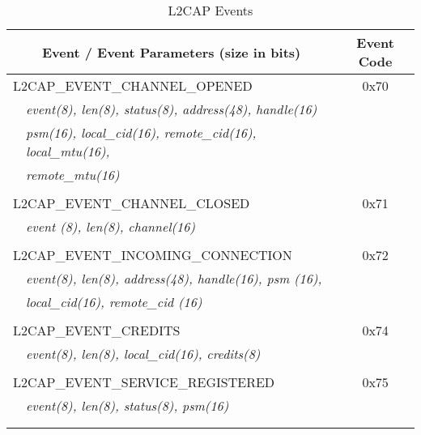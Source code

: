 \begin{table*}[bp]
\caption{L2CAP Events}
\begin{tabular}{p{1cm}p{10cm}c}\toprule
\multicolumn{2}{c}{Event / Event Parameters (size in bits) } & Event Code\\ 
\midrule
\multicolumn{2}{l}{L2CAP\_EVENT\_CHANNEL\_OPENED} & 0x70\\
&\emph{event(8), len(8), status(8), address(48), handle(16)}\\
&\emph{psm(16), local\_cid(16), remote\_cid(16), local\_mtu(16), }\\
&\emph{remote\_mtu(16)}\\
\\
\multicolumn{2}{l}{L2CAP\_EVENT\_CHANNEL\_CLOSED} & 0x71\\
&\emph{event (8), len(8), channel(16)}\\
\\
\multicolumn{2}{l}{L2CAP\_EVENT\_INCOMING\_CONNECTION}& 0x72\\
&\emph{event(8), len(8), address(48), handle(16), psm (16), }\\
&\emph{local\_cid(16), remote\_cid (16)}\\
\\
\multicolumn{2}{l}{L2CAP\_EVENT\_CREDITS} & 0x74\\
&\emph{event(8), len(8), local\_cid(16), credits(8)}\\
\\
\multicolumn{2}{l}{L2CAP\_EVENT\_SERVICE\_REGISTERED} & 0x75\\
&\emph{event(8), len(8), status(8), psm(16)}\\
\\
\bottomrule
 \label{table:l2capEvents}
\end{tabular}
\end{table*}

\pagebreak

